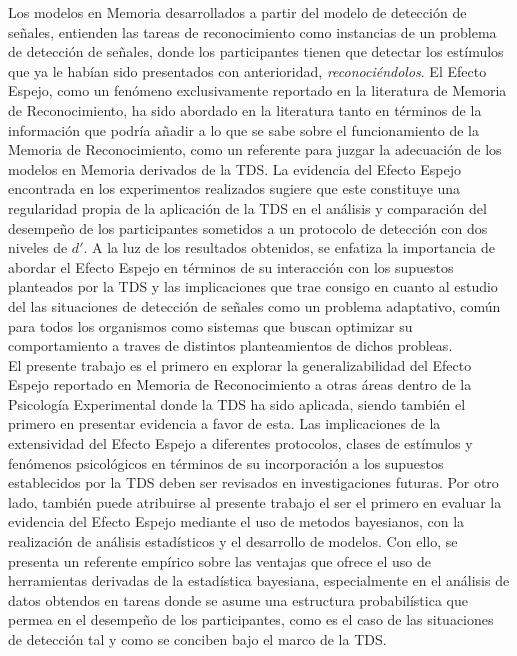 Los modelos en Memoria desarrollados a partir del modelo de detección de señales, entienden las tareas de reconocimiento como instancias de un problema de detección de señales, donde los participantes tienen que detectar los estímulos que ya le habían sido presentados con anterioridad, \textit{reconociéndolos}. El Efecto Espejo, como un fenómeno exclusivamente reportado en la literatura de Memoria de Reconocimiento, ha sido abordado en la literatura tanto en términos de la  información que podría añadir a lo que se sabe sobre el funcionamiento de la Memoria de Reconocimiento, como un referente para juzgar la adecuación de los modelos en Memoria derivados de la TDS. La evidencia del Efecto Espejo encontrada en los experimentos realizados sugiere que este constituye una regularidad propia de la aplicación de la TDS en el análisis y comparación del desempeño de los participantes sometidos a un protocolo de detección con dos niveles de $d'$. A la luz de los resultados obtenidos, se enfatiza la importancia de abordar el Efecto Espejo en términos de su interacción con los supuestos planteados por la TDS y las implicaciones que trae consigo en cuanto al estudio del las situaciones de detección de señales como un problema adaptativo, común para todos los organismos como sistemas que buscan optimizar su comportamiento a traves de distintos planteamientos de dichos probleas.\\

El presente trabajo es el primero en explorar la generalizabilidad del Efecto Espejo reportado en Memoria de Reconocimiento a otras áreas dentro de la Psicología Experimental donde la TDS ha sido aplicada, siendo también el primero en presentar evidencia a favor de esta. Las implicaciones de la extensividad del Efecto Espejo a diferentes protocolos, clases de estímulos y fenómenos psicológicos en términos de su incorporación a los supuestos establecidos por la TDS deben ser revisados en investigaciones futuras. Por otro lado, también puede atribuirse al presente trabajo el ser el primero en evaluar la evidencia del Efecto Espejo mediante el uso de metodos bayesianos, con la realización de análisis estadísticos y el desarrollo de modelos. Con ello, se presenta un referente empírico sobre las ventajas que ofrece el uso de herramientas derivadas de la estadística bayesiana, especialmente en el análisis de datos obtendos en tareas donde se asume una estructura probabilística que permea en el desempeño de los participantes, como es el caso de las situaciones de detección tal y como se conciben bajo el marco de la TDS.\\









